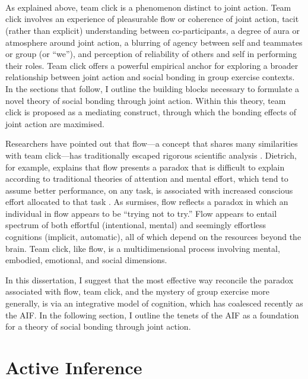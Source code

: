 \begin{CJK}{UTF8}{gbsn}


    \\
    \\
    \\
As explained above, team click is a phenomenon distinct to joint action.  Team click involves an experience of pleasurable flow or coherence of joint action, tacit (rather than explicit) understanding between co-participants, a degree of aura or atmosphere around joint action, a blurring of agency between self and teammates or group (or ``we''), and perception of reliability of others and self in performing their roles.  Team click offers a powerful empirical anchor for exploring a broader relationship between joint action and social bonding in group exercise contexts.  In the sections that follow, I outline the building blocks necessary to formulate a novel theory of social bonding through joint action.  Within this theory, team click is proposed as a mediating construct, through which the bonding effects of joint action are maximised.

Researchers have pointed out that flow---a concept that shares many similarities with team click---has traditionally escaped rigorous scientific analysis \citep{Dietrich2010a,Slingerland2014}.  Dietrich, for example, explains that flow presents a paradox that is difficult to explain according to traditional theories of attention and mental effort, which tend to assume better performance, on any task, is associated with increased conscious effort allocated to that task \citep{Dietrich2004b}.  As \textcite{Slingerland2014} surmises, flow reflects a paradox in which an individual in flow appears to be ``trying not to try.''  Flow appears to entail spectrum of both effortful (intentional, mental) and seemingly effortless cognitions (implicit, automatic), all of which depend on the resources beyond the brain.  Team click, like flow, is a multidimensional process involving mental, embodied, emotional, and social dimensions.

In this dissertation, I suggest that the most effective way reconcile the paradox associated with flow, team click, and the mystery of group exercise more generally, is via an integrative model of cognition, which has coalesced recently as the AIF. In the following section, I outline the tenets of the AIF as a foundation for a theory of social bonding through joint action.


\section{Active Inference \label{sect:activeIn}}


\end{CJK}
